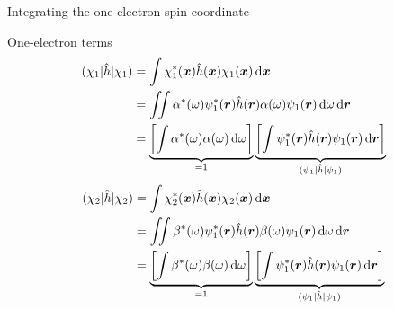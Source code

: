 \documentclass[aspectratio=169,9pt]{beamer}
\newcommand{\br}{\boldsymbol{r}}
\newcommand{\bx}{\boldsymbol{x}}
\newcommand{\hh}{\Hat{h}}
\newcommand{\rmel}[3]{( #1 | #2 | #3 )}
\begin{document}
\begin{frame}{Integrating the one-electron spin coordinate}
	\small
	\begin{block}{One-electron terms}
		\begin{equation*}
		\begin{split}
			\rmel{\chi_1}{\hh}{\chi_1}
			& = \int \chi_1^*(\bx) \hh(\bx) \chi_1(\bx) \dd{\bx} 
			\\
			& = \iint \alpha^*(\omega) \psi_1^*(\br) \hh(\br) \alpha(\omega) \psi_1(\br) \dd{\omega} \dd{\br} 
			\\
			& = \underbrace{\qty[ \int \alpha^*(\omega) \alpha(\omega) \dd{\omega} ]}_{=1} 
			\underbrace{\qty[ \int \psi_1^*(\br) \hh(\br) \psi_1(\br) \dd{\br}]}_{\rmel{\psi_1}{\hh}{\psi_1}  }
		\end{split}
		\end{equation*}
		\begin{equation*}
		\begin{split}
			\rmel{\chi_2}{\hh}{\chi_2} 
			& = \int \chi_2^*(\bx) \hh(\bx) \chi_2(\bx) \dd{\bx} 
			\\
			& = \iint \beta^*(\omega) \psi_1^*(\br) \hh(\br) \beta(\omega) \psi_1(\br) \dd{\omega} \dd{\br} 
			\\
			& = \underbrace{\qty[ \int \beta^*(\omega) \beta(\omega) \dd{\omega} ]}_{=1} 
			\underbrace{\qty[ \int \psi_1^*(\br) \hh(\br) \psi_1(\br)  \dd{\br} ]}_{\rmel{\psi_1}{\hh}{\psi_1} }
		\end{split}
		\end{equation*}
	\end{block}
\end{frame}
\end{document}

